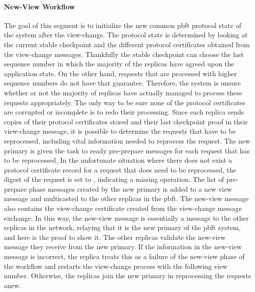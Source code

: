 \paragraph{New-View Workflow}
\vspace{1cm}

The goal of this segment is to initialize the new common \ac{pbft} protocol state of the system after the view-change. The protocol state is determined by looking at the current stable checkpoint and the different protocol certificates obtained from the view-change messages. Thankfully the stable checkpoint can choose the last sequence number in which the majority of the replicas have agreed upon the application state. On the other hand, requests that are processed with higher sequence numbers do not have that guarantee. Therefore, the system is unsure whether or not the majority of replicas have actually managed to process these requests appropriately. The only way to be sure none of the protocol certificates are corrupted or incomplete is to redo their processing. Since each replica sends copies of their protocol certificates stored and their last checkpoint proof in their view-change message, it is possible to determine the requests that have to be reprocessed, including vital information needed to reprocess the request. The new primary is given the task to ready pre-prepare messages for each request that has to be reprocessed. In the unfortunate situation where there does not exist a protocol certificate record for a request that does need to be reprocessed, the digest of the request is set to , indicating a missing operation. The list of pre-prepare phase messages created by the new primary is added to a new view message and multicasted to the other replicas in the \ac{pbft}. The new-view message also contains the view-change certificate created from the view-change message exchange. In this way, the new-view message is essentially a message to the other replicas in the network, relaying that it is the new primary of the \ac{pbft} system, and here is the proof to show it. The other replicas validate the new-view message they receive from the new primary. If the information in the new-view message is incorrect, the replica treats this as a failure of the new-view phase of the workflow and restarts the view-change process with the following view number. Otherwise, the replicas join the new primary in reprocessing the requests anew. 

